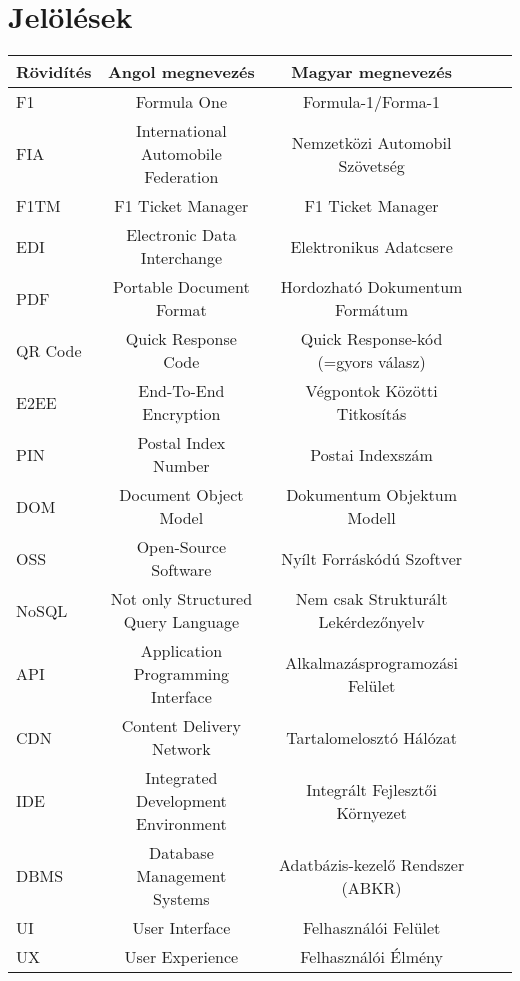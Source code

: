 \chapter{Jelölések}%

\begin{table}[h!]
	\centering
	\begin{tabular}{ | l | c | c | c | c |}
		\hline 
		\textbf{Rövidítés} & \textbf{Angol megnevezés} & \textbf{Magyar megnevezés}\\
		\hline
		F1 & Formula One & Formula-1/Forma-1\\
		\hline
		FIA & International Automobile Federation & Nemzetközi Automobil Szövetség \\
		\hline
		F1TM & F1 Ticket Manager & F1 Ticket Manager \\
		\hline
		EDI & Electronic Data Interchange & Elektronikus Adatcsere \\
		\hline
		PDF & Portable Document Format & Hordozható Dokumentum Formátum \\
		\hline
		QR Code & Quick Response Code & Quick Response-kód (=gyors válasz) \\
		\hline
		E2EE & End-To-End Encryption & Végpontok Közötti Titkosítás \\
		\hline
		PIN & Postal Index Number & Postai Indexszám \\
		\hline
		DOM & Document Object Model & Dokumentum Objektum Modell \\
		\hline
		OSS & Open-Source Software & Nyílt Forráskódú Szoftver \\
		\hline
		NoSQL & Not only Structured Query Language & Nem csak Strukturált
		 Lekérdezőnyelv \\
		\hline
		API & Application Programming Interface & Alkalmazásprogramozási Felület \\
		\hline
		CDN & Content Delivery Network & Tartalomelosztó Hálózat \\
		\hline
		IDE & Integrated Development Environment & Integrált Fejlesztői Környezet \\
		\hline
		DBMS & Database Management Systems & Adatbázis-kezelő Rendszer (ABKR) \\
		\hline
		UI & User Interface & Felhasználói Felület \\
		\hline
		UX & User Experience & Felhasználói Élmény \\

\end{tabular}
\end{table}
